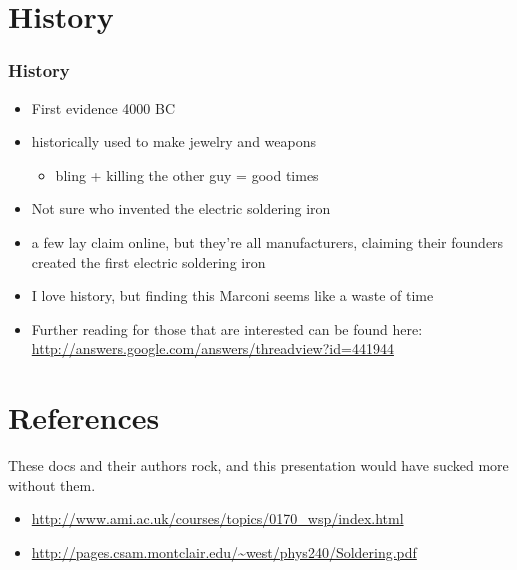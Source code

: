 \documentclass{beamer}
\begin{document}
\section{History}
\begin{frame}
  \frametitle{History}
  \begin{itemize}
    \item First evidence 4000 BC
    \item historically used to make jewelry and weapons
      \begin{itemize}
      \item bling + killing the other guy = good times
      \end{itemize}
    \item Not sure who invented the electric soldering iron
    \item a few lay claim online, but they're all manufacturers,
      claiming their founders created the first electric soldering
      iron
    \item I love history, but finding this Marconi seems like a waste
      of time
    \item Further reading for those that are interested can be found
      here:
      \url{http://answers.google.com/answers/threadview?id=441944}
  \end{itemize}
\end{frame}

\section{References}

\begin{frame}
  These docs and their authors rock, and this presentation would have
  sucked more without them.
  \begin{itemize}
    \item \url{http://www.ami.ac.uk/courses/topics/0170_wsp/index.html}
    \item \url{http://pages.csam.montclair.edu/~west/phys240/Soldering.pdf}
  \end{itemize}
\end{frame}
\end{document}
